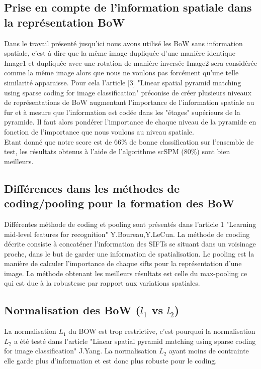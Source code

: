 \documentclass[a4paper]{article}
\begin{document}
\subsection{Prise en compte de l'information spatiale dans la représentation BoW}
Dans le travail présenté jusqu'ici nous avons utilisé les BoW sans information spatiale, c'est à dire que la même image dupliquée d'une manière identique Image1 et dupliquée avec une rotation de manière inversée Image2 sera considérée comme la même image alors que nous ne voulons pas forcément qu'une telle similarité apparaisse. Pour cela l'article [3] "Linear spatial pyramid matching using sparse coding for image classification" préconise de créer plusieurs niveaux de représentations de BoW augmentant l'importance de l'information spatiale au fur et à mesure que l'information est codée dans les "étages" supérieurs de la pyramide. Il faut alors pondérer l'importance de chaque niveau de la pyramide en fonction de l'importance que nous voulons au niveau spatiale.\\
Etant donné que notre score est de 66\% de bonne classification sur l'ensemble de test, les résultats obtenus à l'aide de l'algorithme scSPM (80\%) sont bien meilleurs.

\subsection{Différences dans les méthodes de coding/pooling pour la formation des BoW}
Différentes méthode de coding et pooling sont présentés dans l'article 1 "Learning mid-level features for recognition" Y.Boureau,Y.LeCun. La méthode de cooding décrite consiste à concaténer l'information des SIFTs se situant dans un voisinage proche, dans le but de garder une information de spatialisation. Le pooling est la manière de calculer l'importance de chaque sifts pour la représentation d'une image. La méthode obtenant les meilleurs résultats est celle du max-pooling ce qui est due à la robustesse par rapport aux variations spatiales.


\subsection{Normalisation des BoW ($l_1$ vs  $l_2$)}
La normalisation $L_1$ du BOW est trop restrictive, c'est pourquoi la normalisation $L_2$ a été testé dans l'article "Linear spatial pyramid matching using sparse coding for image classification" J.Yang. La normalisation $L_2$ ayant moins de contrainte elle garde plus d'information et est donc plus robuste pour le coding.
\end{document}
